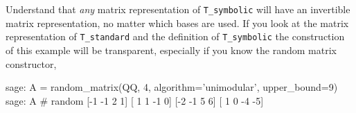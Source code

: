 %
Understand that \emph{any} matrix representation of \verb?T_symbolic? will have an invertible matrix representation, no matter which bases are used.  If you look at the matrix representation of \verb?T_standard? and the definition of \verb?T_symbolic? the construction of this example will be transparent, especially if you know the random matrix constructor,
%
\begin{sageexample}
sage: A = random_matrix(QQ, 4, algorithm='unimodular', upper_bound=9)
sage: A                                                      # random
[-1 -1  2  1]
[ 1  1 -1  0]
[-2 -1  5  6]
[ 1  0 -4 -5]
\end{sageexample}
%
\begin{sageverbatim}
\end{sageverbatim}
%









